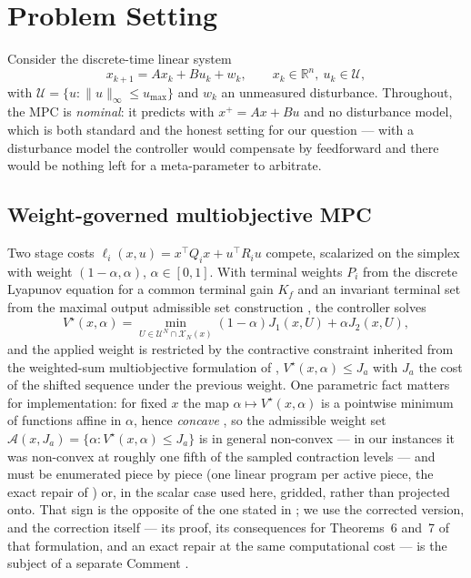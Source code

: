 \documentclass[journal]{IEEEtran}
\theoremstyle{definition}
\newcommand{\Rset}{\mathbb{R}}
\newcommand{\vstar}{V^\star}
\newcommand{\Ja}{J_a}
\begin{document}
\section{Problem Setting}\label{sec:setting}
Consider the discrete-time linear system
\begin{equation}
x_{k+1}=Ax_k+Bu_k+w_k,\qquad x_k\in\Rset^n,\ u_k\in\mathcal{U},
\label{eq:plant}
\end{equation}
with $\mathcal{U}=\{u:\|u\|_\infty\le u_{\max}\}$ and $w_k$ an unmeasured
disturbance. Throughout, the MPC is \emph{nominal}: it predicts with
$x^+=Ax+Bu$ and no disturbance model, which is both standard and the honest
setting for our question --- with a disturbance model the controller would
compensate by feedforward and there would be nothing left for a meta-parameter
to arbitrate.

\subsection{Weight-governed multiobjective MPC}
Two stage costs $\ell_i(x,u)=x^\top Q_i x+u^\top R_i u$ compete, scalarized on
the simplex with weight $(1-\alpha,\alpha)$, $\alpha\in[0,1]$. With terminal
weights $P_i$ from the discrete Lyapunov equation for a common terminal gain
$K_f$ and an invariant terminal set from the maximal output admissible set
construction \cite{gilbert1991}, the controller solves
\begin{equation}
\vstar(x,\alpha)=\min_{U\in\mathcal{U}^N\cap\mathcal{X}_N(x)}
(1-\alpha)J_1(x,U)+\alpha J_2(x,U),
\label{eq:mompc}
\end{equation}
and the applied weight is restricted by the contractive constraint inherited
from the weighted-sum multiobjective formulation of \cite{bemporad2009mompc},
$\vstar(x,\alpha)\le\Ja$ with $\Ja$ the cost of the shifted sequence under the
previous weight. One parametric fact matters for implementation: for fixed $x$
the map $\alpha\mapsto\vstar(x,\alpha)$ is a pointwise minimum of functions
affine in $\alpha$, hence \emph{concave} \cite[Sec.~5.6.1,
Ex.~3.9]{boyd2004}, so the admissible weight set
$\mathcal{A}(x,\Ja)=\{\alpha:\vstar(x,\alpha)\le\Ja\}$ is in general
non-convex --- in our instances it was non-convex at roughly one fifth of the
sampled contraction levels --- and must be enumerated piece by piece (one
linear program per active piece, the exact repair of \cite{comment2026}) or,
in the scalar case used here, gridded, rather than projected onto. That sign is the opposite of the one stated in
\cite[Lemma~4]{bemporad2009mompc}; we use the corrected version, and the
correction itself --- its proof, its consequences for Theorems~6 and~7 of
that formulation, and an exact repair at the same computational cost --- is
the subject of a separate Comment \cite{comment2026}.
\end{document}
